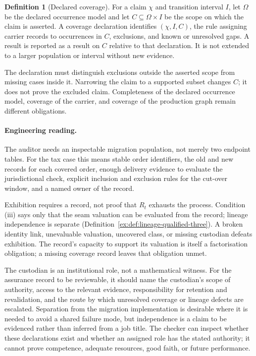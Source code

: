 \documentclass[11pt]{article}
\theoremstyle{definition}
\newtheorem{definition}{Definition}[section]
\begin{document}
\begin{definition}[Declared coverage]\label{ex:def:coverage}
For a claim $\chi$ and transition interval $I$, let $\Omega$ be the declared occurrence model and let $C\subseteq\Omega\times I$ be the scope on which the claim is asserted. A coverage declaration identifies $(\chi,I,C)$, the rule assigning carrier records to occurrences in $C$, exclusions, and known or unresolved gaps. A result is reported as a result on $C$ relative to that declaration. It is not extended to a larger population or interval without new evidence.
\end{definition}

The declaration must distinguish exclusions outside the asserted scope from missing cases inside it. Narrowing the claim to a supported subset changes $C$; it does not prove the excluded claim. Completeness of the declared occurrence model, coverage of the carrier, and coverage of the production graph remain different obligations.


\paragraph{Engineering reading.} The auditor needs an inspectable migration population, not merely two endpoint tables. For the tax case this means stable order identifiers, the old and new records for each covered order, enough delivery evidence to evaluate the jurisdictional check, explicit inclusion and exclusion rules for the cut-over window, and a named owner of the record.

Exhibition requires a record, not proof that $R_t$ exhausts the process. Condition (iii) says only that the seam valuation can be evaluated from the record; lineage independence is separate (Definition~\ref{ex:def:lineage-qualified-three}). A broken identity link, unevaluable valuation, uncovered class, or missing custodian defeats exhibition. The record's capacity to support its valuation is itself a factorisation obligation; a missing coverage record leaves that obligation unmet.

The custodian is an institutional role, not a mathematical witness. For the assurance record to be reviewable, it should name the custodian's scope of authority, access to the relevant evidence, responsibility for retention and revalidation, and the route by which unresolved coverage or lineage defects are escalated. Separation from the migration implementation is desirable where it is needed to avoid a shared failure mode, but independence is a claim to be evidenced rather than inferred from a job title. The checker can inspect whether these declarations exist and whether an assigned role has the stated authority; it cannot prove competence, adequate resources, good faith, or future performance.
\end{document}
